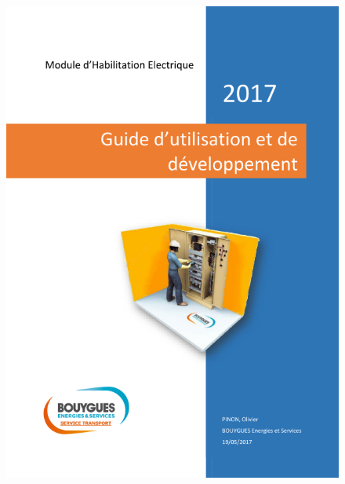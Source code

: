 \documentclass[a4paper]{article}
\begin{document}
    \begin{figure}[H]
        \centering
        \includegraphics[scale=0.35]{img/DocTechnique1}

\end{figure}
\end{document}
